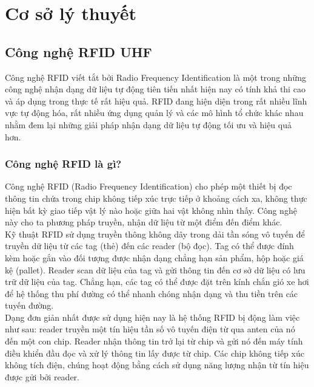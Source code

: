 \headerandfooterconfig

\chapter{Cơ sở lý thuyết}

\section{Công nghệ RFID UHF}
Công nghệ RFID viết tắt bởi Radio Frequency Identification là một trong những công nghệ nhận dạng dữ liệu tự động tiên tiến nhất hiện nay có tính khả thi cao và áp dụng trong thực tế rất hiệu quả. RFID đang hiện diện trong rất nhiều lĩnh vực tự động hóa, rất nhiều ứng dụng quản lý và các mô hình tổ chức khác nhau nhằm đem lại những giải pháp nhận dạng dữ liệu tự động tối ưu và hiệu quả hơn.
\subsection{Công nghệ RFID là gì?}
Công nghệ RFID (Radio Frequency Identification) cho phép một thiết bị đọc thông tin chứa trong chip không tiếp xúc trực tiếp ở khoảng cách xa, không thực hiện bất kỳ giao tiếp vật lý nào hoặc giữa hai vật không nhìn thấy. Công nghệ này cho ta phương pháp truyền, nhận dữ liệu từ một điểm đến điểm khác. \\
Kỹ thuật RFID sử dụng truyền thông không dây trong dải tần sóng vô tuyến để truyền dữ liệu từ các tag (thẻ) đến các reader (bộ đọc). Tag có thể được đính kèm hoặc gắn vào đối tượng được nhận dạng chẳng hạn sản phẩm, hộp hoặc giá kệ (pallet). Reader scan dữ liệu của tag và gửi thông tin đến cơ sở dữ liệu có lưu trữ dữ liệu của tag. Chẳng hạn, các tag có thể được đặt trên kính chắn gió xe hơi để hệ thống thu phí đường có thể nhanh chóng nhận dạng và thu tiền trên các tuyến đường.\\
Dạng đơn giản nhất được sử dụng hiện nay là hệ thống RFID bị động làm việc như sau: reader truyền một tín hiệu tần số vô tuyến điện từ qua anten của nó đến một con chip. Reader nhận thông tin trở lại từ chip và gửi nó đến máy tính điều khiển đầu đọc và xử lý thông tin lấy được từ chip. Các chip không tiếp xúc không tích điện, chúng hoạt động bằng cách sử dụng năng lượng nhận từ tín hiệu được gửi bởi reader.
